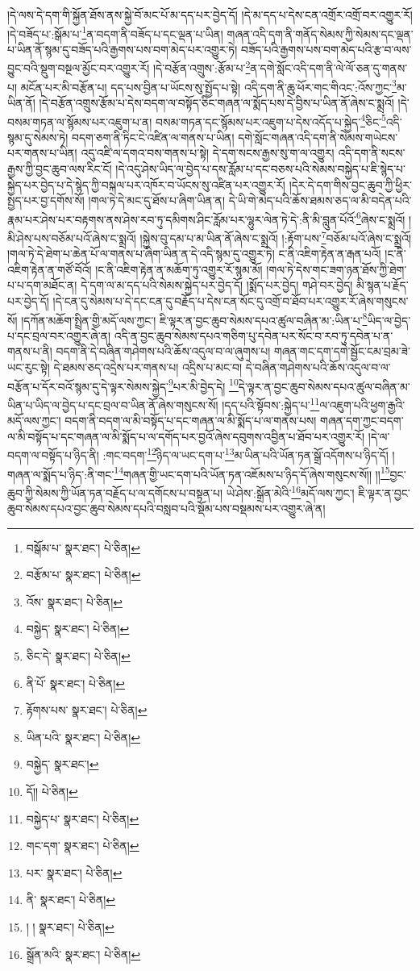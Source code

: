 །དེ་ལས་དེ་དག་གི་སྐྱོན་ཐོས་ནས་སྐྱེ་བོ་མང་པོ་མ་དད་པར་བྱེད་དོ། །དེ་མ་དད་པ་དེས་ངན་འགྲོར་འགྲོ་བར་འགྱུར་རོ། །དེ་བཟོད་པ་:སྒོམ་པ་\footnote{བསྒོམ་པ་  སྣར་ཐང་།  པེ་ཅིན། }ན་བདག་ནི་བཟོད་པ་དང་ལྡན་པ་ཡིན། གཞན་འདི་དག་ནི་གནོད་སེམས་ཀྱི་སེམས་དང་ལྡན་པ་ཡིན་ནོ་སྙམ་དུ་བཟོད་པའི་རྒྱགས་པས་བག་མེད་པར་འགྱུར་ཏེ། བཟོད་པའི་རྒྱགས་པས་བག་མེད་པའི་རྩ་བ་ལས་བྱུང་བའི་སྡུག་བསྔལ་མྱོང་བར་འགྱུར་རོ། །དེ་བརྩོན་འགྲུས་:རྩོམ་པ་\footnote{བརྩོམ་པ་  སྣར་ཐང་།  པེ་ཅིན། }ན་དགེ་སློང་འདི་དག་ནི་ལེ་ལོ་ཅན་དུ་གནས་པ། མངོན་པར་མི་བརྩོན་པ། དད་པས་བྱིན་པ་ཡོངས་སུ་སྤྱོད་པ་སྟེ། འདི་དག་ནི་ཆུ་ཕོར་གང་གིའང་:འོས་ཀྱང་\footnote{འོས་  སྣར་ཐང་།  པེ་ཅིན། }མ་ཡིན་ནོ། །དེ་བརྩོན་འགྲུས་རྩོམ་པ་དེས་བདག་ལ་བསྟོད་ཅིང་གཞན་ལ་སྨོད་པས་དེ་བྱིས་པ་ཡིན་ནོ་ཞེས་ང་སྨྲའོ། །དེ་བསམ་གཏན་ལ་སྙོམས་པར་འཇུག་པ་ན། བསམ་གཏན་དང་སྙོམས་པར་འཇུག་པ་དེས་འདོད་པ་སྐྱེད་\footnote{བསྐྱེད་  སྣར་ཐང་།  པེ་ཅིན། }ཅིང་\footnote{ཅིང་དེ་  སྣར་ཐང་།  པེ་ཅིན། }འདི་སྙམ་དུ་སེམས་ཏེ། བདག་ཅག་ནི་ཏིང་ངེ་འཛིན་ལ་གནས་པ་ཡིན། དགེ་སློང་གཞན་འདི་དག་ནི་སེམས་གཡེངས་པར་གནས་པ་ཡིན། འདུ་འཛི་ལ་དགའ་བས་གནས་པ་སྟེ། དེ་དག་སངས་རྒྱས་སུ་ག་ལ་འགྱུར། འདི་དག་ནི་སངས་རྒྱས་ཀྱི་བྱང་ཆུབ་ལས་རིང་ངོ། །དེ་འདུ་ཤེས་ཡིད་ལ་བྱེད་པ་དས་རློམ་པ་དང་བཅས་པའི་སེམས་བསྐྱེད་པ་ཇི་སྙེད་པ་སྐྱེད་པར་བྱེད་པ་དེ་སྙེད་ཀྱི་བསྐལ་པར་འཁོར་བ་ཡོངས་སུ་འཛིན་པར་འགྱུར་རོ། །དེར་དེ་དག་གིས་བྱང་ཆུབ་ཀྱི་ཕྱིར་སྤྱད་པར་བྱ་དགོས་སོ། །གལ་ཏེ་དེ་མང་དུ་ཐོས་པ་ཞིག་ཡིན་ན། དེ་ཡི་གེ་མེད་པའི་ཆོས་ཐམས་ཅད་ལ་མི་བདེན་པའི་རྣམ་པར་ཤེས་པར་བརྟགས་ནས་ཤེས་རབ་ཏུ་དམིགས་ཤིང་རློམ་པར་ལྷུར་ལེན་ཏེ་དེ་:ནི་མི་བླུན་པོའོ་\footnote{ནི་པོ་  སྣར་ཐང་།  པེ་ཅིན། }ཞེས་ང་སྨྲའོ། །མི་ཤེས་པས་བཅོམ་པའོ་ཞེས་ང་སྨྲའོ། །སྐྱེས་བུ་དམ་པ་མ་ཡིན་ནོ་ཞེས་ང་སྨྲའོ། །:རྟོག་པས་\footnote{རྟོགས་པས་  སྣར་ཐང་།  པེ་ཅིན། }བཅོམ་པའོ་ཞེས་ང་སྨྲའོ། །གལ་ཏེ་དེ་ཐེག་པ་ཆེན་པོ་ལ་གནས་པ་ཞིག་ཡིན་ན་དེ་འདི་སྙམ་དུ་འགྱུར་ཏེ། ང་ནི་འཇིག་རྟེན་ན་རྒན་པའོ། །ང་ནི་འཇིག་རྟེན་ན་གཙོ་བོའོ། །ང་ནི་འཇིག་རྟེན་ན་མཆོག་ཏུ་འགྱུར་རོ་སྙམ་མོ། །གལ་ཏེ་དེས་གང་ཟག་ཉན་ཐོས་ཀྱི་ཐེག་པ་པ་དག་མཐོང་ན། དེ་དག་ལ་མ་དད་པའི་སེམས་སྐྱེད་པར་བྱེད་དོ། །སྨོད་པར་བྱེད། གཤེ་བར་བྱེད། མི་སྙན་པ་རྗོད་པར་བྱེད་དོ། །དེ་ངན་དུ་སེམས་པ་དེ་དང་ངན་དུ་བརྗོད་པ་དེས་ངན་སོང་དུ་འགྲོ་བ་ཐོབ་པར་འགྱུར་རོ་ཞེས་གསུངས་སོ། །དཀོན་མཆོག་སྤྲིན་གྱི་མདོ་ལས་ཀྱང་། ཇི་ལྟར་ན་བྱང་ཆུབ་སེམས་དཔའ་ཚུལ་བཞིན་མ་:ཡིན་པ་\footnote{ཡིན་པའི་  སྣར་ཐང་།  པེ་ཅིན། }ཡིད་ལ་བྱེད་པ་དང་བྲལ་བར་འགྱུར་ཞེ་ན། འདི་ན་བྱང་ཆུབ་སེམས་དཔའ་གཅིག་པུ་དབེན་པར་སོང་བ་རབ་ཏུ་དབེན་པ་ན་གནས་པ་ནི། བདག་ནི་དེ་བཞིན་གཤེགས་པའི་ཆོས་འདུལ་བ་ལ་ཞུགས་པ། གཞན་གང་དག་དགེ་སྦྱོང་ངམ་བྲམ་ཟེ་ཡང་རུང་སྟེ། དེ་ཐམས་ཅད་འདྲེས་པར་གནས་པ། འདྲིས་པ་མང་བ། དེ་བཞིན་གཤེགས་པའི་ཆོས་འདུལ་བ་ལ་བརྩོན་པ་དོར་བའོ་སྙམ་དུ་དེ་ལྟར་སེམས་སྐྱེད་\footnote{བསྐྱེད་  སྣར་ཐང་། }པར་མི་བྱེད་དེ། \footnote{དོ།།   པེ་ཅིན། }དེ་ལྟར་ན་བྱང་ཆུབ་སེམས་དཔའ་ཚུལ་བཞིན་མ་ཡིན་པ་ཡིད་ལ་བྱེད་པ་དང་བྲལ་བ་ཡིན་ནོ་ཞེས་གསུངས་སོ། །དད་པའི་སྟོབས་:སྐྱེད་པ་\footnote{བསྐྱེད་པ་  སྣར་ཐང་།  པེ་ཅིན། }ལ་འཇུག་པའི་ཕྱག་རྒྱའི་མདོ་ལས་ཀྱང་། བདག་ནི་བདག་ལ་མི་བསྟོད་པ་དང་གཞན་ལ་མི་སྨོད་པ་ལ་གནས་པས། གཞན་དག་ཀྱང་བདག་ལ་མི་བསྟོད་པ་དང་གཞན་ལ་མི་སྨོད་པ་ལ་དགོད་པར་བྱའོ་ཞེས་དབུགས་འབྱིན་པ་ཐོབ་པར་འགྱུར་རོ། །དེ་ལ་བདག་ལ་བསྟོད་པ་ཉིད་ནི། :གང་བདག་\footnote{གང་དག་  སྣར་ཐང་།  པེ་ཅིན། }ཉིད་ལ་ཡང་དག་པ་\footnote{པར་  སྣར་ཐང་།  པེ་ཅིན། }མ་ཡིན་པའི་ཡོན་ཏན་སྒྲོ་འདོགས་པ་ཉིད་དོ། །གཞན་ལ་སྨོད་པ་ཉིད་:ནི་གང་\footnote{ནི་  སྣར་ཐང་།  པེ་ཅིན། }གཞན་གྱི་ཡང་དག་པའི་ཡོན་ཏན་འཇོམས་པ་ཉིད་དོ་ཞེས་གསུངས་སོ།། །།\footnote{། །  སྣར་ཐང་།  པེ་ཅིན། }བྱང་ཆུབ་ཀྱི་སེམས་ཀྱི་ཡོན་ཏན་བརྗོད་པ་ལ་དགོངས་པ་བསྟན་པ། ཡེ་ཤེས་:སྒྲོན་མེའི་\footnote{སྒྲོན་མའི་  སྣར་ཐང་།  པེ་ཅིན། }མདོ་ལས་ཀྱང་། ཇི་ལྟར་ན་བྱང་ཆུབ་སེམས་དཔའ་བྱང་ཆུབ་སེམས་དཔའི་བསླབ་པའི་སྡོམ་པས་བསྡམས་པར་འགྱུར་ཞེ་ན། 
